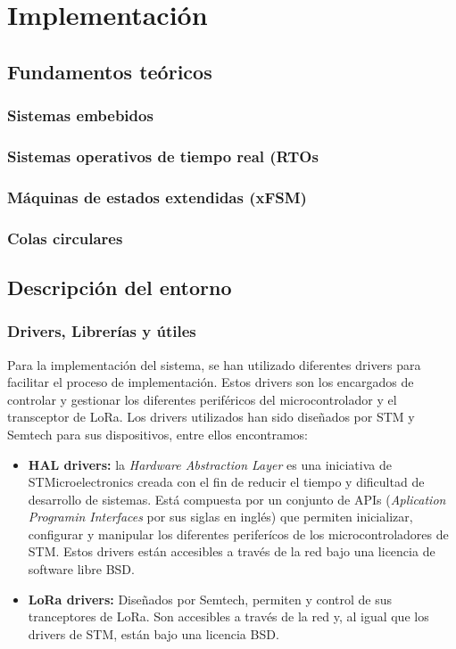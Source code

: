 	\section{Implementación}
	
	\subsection{Fundamentos teóricos}
		\subsubsection{Sistemas embebidos}
		
		\subsubsection{Sistemas operativos de tiempo real (RTOs}
		
		\subsubsection{Máquinas de estados extendidas (xFSM)}
		
		\subsubsection{Colas circulares }
		
	\subsection{Descripción del entorno}
		\subsubsection{Drivers, Librerías y útiles}
			Para la implementación del sistema, se han utilizado diferentes drivers para facilitar el proceso de implementación. Estos drivers son los encargados de controlar y gestionar los diferentes periféricos del microcontrolador y el transceptor de LoRa. Los drivers utilizados han sido diseñados por STM y Semtech para sus dispositivos, entre ellos encontramos:
			
			\begin{itemize}
				\item \textbf{HAL drivers:}  la \textit{Hardware Abstraction Layer} es una iniciativa de STMicroelectronics creada con el fin de reducir el tiempo y dificultad de desarrollo de sistemas. Está compuesta por un conjunto de APIs (\textit{Aplication Programin Interfaces} por sus siglas en inglés) que permiten inicializar, configurar y manipular los diferentes periferícos de los microcontroladores de STM. Estos drivers están accesibles a  través de la red bajo una licencia de software libre BSD.
				
				\item \textbf{LoRa drivers:} Diseñados por Semtech, permiten y control de sus tranceptores de LoRa. Son accesibles a través de la red y, al igual que los drivers de STM, están bajo una licencia BSD.
			\end{itemize}			 
			
